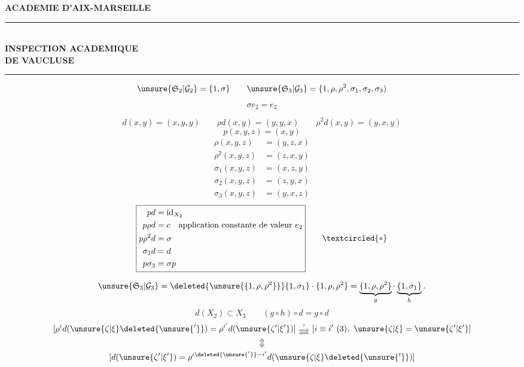 
\textbf{ACADEMIE D'AIX-MARSEILLE}\\
\rule{3cm}{.4pt}\\
\textbf{INSPECTION ACADEMIQUE}\\
\textbf{DE VAUCLUSE}\\
\rule{1cm}{.4pt}

\[
\unsure{\mathfrak S_2|\mathcal G_2}=\{1,\sigma\}\qquad
\unsure{\mathfrak S_3|\mathcal G_3}=\{1,\rho,\rho^2,\sigma_1,\sigma_2,\sigma_3)
\]
\margin{$[\rho^3=1,\inserted{\sigma_i^2=1,}\rho\sigma_i\rho^{-1}=\sigma_{i+1}\quad(\sigma_4=\sigma_1)]$}

\[
\sigma e_2=e_2
\]
\margin{$-$}

\[
d(x,y)=(x,y,y)\qquad\rho d(x,y)=(y,y,x)\qquad\rho^2d(x,y)=(y,x,y)
\]
\[
p(x,y,z)=(x,y)
\]
\[
\begin{aligned}
\rho(x,y,z)&=(y,z,x)\\
\rho^2(x,y,z)&=(z,x,y)\\
\sigma_1(x,y,z)&=(x,z,y)\\
\sigma_2(x,y,z)&=(z,y,x)\\
\sigma_3(x,y,z)&=(y,x,z)
\end{aligned}
\]
\[
\boxed{\begin{aligned}
pd&=\mathrm{id}_{X_2}\\
p\rho d&=c\quad\text{application constante de valeur }e_2\\
p\rho^2d&=\sigma\\
\sigma_1d&=d\\
p\sigma_3&=\sigma p
\end{aligned}}\qquad\textcircled{*}
\]

\[
\unsure{\mathfrak S_3|\mathcal G_3}
=\deleted{\unsure{\{1,\rho,\rho^2\}}}\{1,\sigma_1\}\cdot\{1,\rho,\rho^2\}
=\underbrace{\{1,\rho,\rho^2\}}_g\cdot\underbrace{\{1,\sigma_1\}}_h.
\]
\[
d(X_2)\subset X_3\qquad(g\circ h)\circ d=g\circ d
\]
\[
\begin{gathered}
[\rho^i d(\unsure{\zeta|\xi}\deleted{\unsure{'}})=\rho^{i'}d(\unsure{\zeta'|\xi'})]
\ \substack{\overset{?}{\Longrightarrow}\\[-2pt]\Longleftarrow}\
[i\equiv i'\ (3),\ \unsure{\zeta|\xi}=\unsure{\zeta'|\xi'}]\\
\Updownarrow\\
[d(\unsure{\zeta'|\xi'})=\rho^{i\deleted{\unsure{'}}-i'}d(\unsure{\zeta|\xi}\deleted{\unsure{'}})]
\end{gathered}
\]

